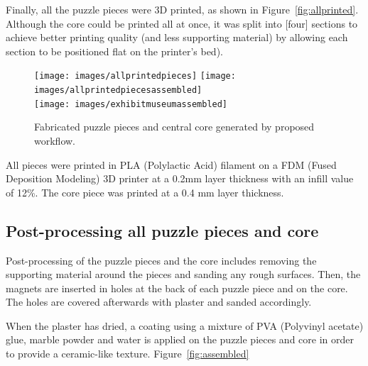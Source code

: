 \documentclass[acmlarge,screen,dvipsnames]{acmart}
\begin{document}
Finally, all the puzzle pieces were 3D printed, as shown in
Figure~\ref{fig:allprinted}. Although the core could be printed all at
once, it was split into [four] sections to achieve better printing
quality (and less supporting material) by allowing each section to be
positioned flat on the printer's bed).

\begin{figure}[h]
  \centering

  \centering
  {\texttt{[image: images/allprintedpieces]}}
  {\texttt{[image: images/allprintedpiecesassembled]}}\\
  {\texttt{[image: images/exhibitmuseumassembled]}}
    \caption{Fabricated puzzle pieces and central core generated by proposed workflow.}
\end{figure}

All pieces were printed in PLA (Polylactic Acid) filament on a FDM
(Fused Deposition Modeling) 3D printer at a 0.2mm layer thickness with
an infill value of 12\%. The core piece was printed at a 0.4 mm layer
thickness.


\subsection{Post-processing all puzzle pieces and core}

Post-processing of the puzzle pieces and the core includes removing
the supporting material around the pieces and sanding any rough
surfaces. Then, the magnets are inserted in holes at the back of each
puzzle piece and on the core. The holes are covered afterwards with
plaster and sanded accordingly.

When the plaster has dried, a coating using a mixture of PVA
(Polyvinyl acetate) glue, marble powder and water is applied on the
puzzle pieces and core in order to provide a ceramic-like
texture. Figure~\ref{fig:assembled} 
\end{document}

